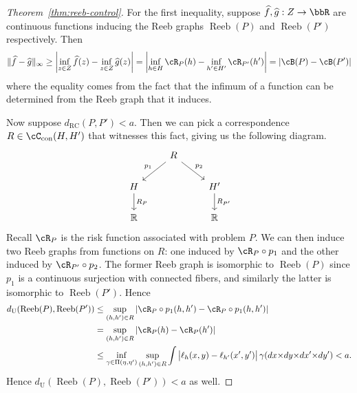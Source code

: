 \documentclass[twoside,11pt]{article}
\newcommand{\dexpcon}[1][]{d_{\operatorname{RC}#1}}
\DeclareMathOperator{\reeb}{Reeb}
\newcommand{\con}{\cC_{\mathrm{con}}}%
\begin{document}
\begin{proof}[Theorem~\ref{thm:reeb-control}]
    For the first inequality, suppose $\widehat f,\widehat g:Z\to \bbR$ are continuous functions inducing the Reeb graphs $\reeb(P)$ and $\reeb(P')$ respectively. Then
    \[\|\widehat f - \widehat g\|_{\infty} \geq
    \left |\inf_{z\in Z} \widehat f(z) - \inf_{z\in Z} \widehat g(z)\right |
    = \left|\inf_{h\in H} \cR_P(h) - \inf_{h'\in H'} \cR_{P'}(h')\right| = |\cB(P) - \cB(P')|\]
    where the equality comes from the fact that the infimum of a function can be determined from the Reeb graph that it induces.
    
    Now suppose $\dexpcon(P,P')<a$. Then we can pick a correspondence $R\in \con(H,H')$ that witnesses this fact, giving us the following diagram.
    \[
    \begin{tikzcd}
    & R \ar[dl,"p_1",swap] \ar[dr,"p_2"]\\
    H \ar[d,"R_P"] & & H' \ar[d,"R_{P'}"]\\
    \mathbb{R} && \mathbb{R}
    \end{tikzcd}  
    \]
    Recall $\cR_P$ is the risk function associated with problem $P$. We can then induce two Reeb graphs from functions on $R$: one induced by $\cR_P\circ p_1$ and the other induced by $\cR_{P'} \circ p_2$. The former Reeb graph is isomorphic to $\reeb(P)$ since $p_1$ is a continuous surjection with connected fibers, and similarly the latter is isomorphic to $\reeb(P')$. Hence
    \begin{align*}
    d_{\mathrm{U}}(\reeb(P),\reeb(P')) & \leq \sup_{(h,h')\in R} |\cR_P\circ p_1(h,h') - \cR_P\circ p_1(h,h')|
    \\ & =
    \sup_{(h,h')\in R} |\cR_P(h) - \cR_P(h')|\\
    & \leq 
    \inf_{\gamma \in \Pi(\eta,\eta')} \sup_{(h,h')\in R} \int \big| \ell_h(x,y) - \ell_{h'}(x',y')\big | \,\gamma(dx{\times} dy{\times} dx'{\times} dy')<a.
    \end{align*}
    Hence $d_{\mathrm{U}}(\reeb(P),\reeb(P'))<a$ as well.
\end{proof}
\end{document}
